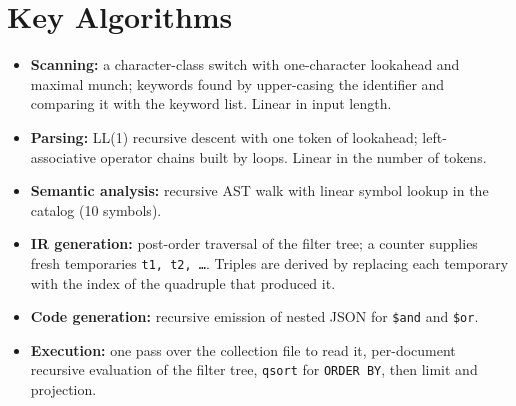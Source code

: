 \documentclass[12pt,a4paper]{report}
\newcommand{\codeus}{\textunderscore\allowbreak}
\DeclareRobustCommand{\code}[1]{\texttt{\let\_\codeus #1}}
\begin{document}
\section{Key Algorithms}
\begin{itemize}
  \item \textbf{Scanning:} a character-class switch with one-character lookahead and maximal munch; keywords found by upper-casing the identifier and comparing it with the keyword list. Linear in input length.
  \item \textbf{Parsing:} LL(1) recursive descent with one token of lookahead; left-associative operator chains built by loops. Linear in the number of tokens.
  \item \textbf{Semantic analysis:} recursive AST walk with linear symbol lookup in the catalog (10 symbols).
  \item \textbf{IR generation:} post-order traversal of the filter tree; a counter supplies fresh temporaries \code{t1, t2, \ldots}. Triples are derived by replacing each temporary with the index of the quadruple that produced it.
  \item \textbf{Code generation:} recursive emission of nested JSON for \code{\$and} and \code{\$or}.
  \item \textbf{Execution:} one pass over the collection file to read it, per-document recursive evaluation of the filter tree, \code{qsort} for \code{ORDER BY}, then limit and projection.
\end{itemize}
\end{document}
